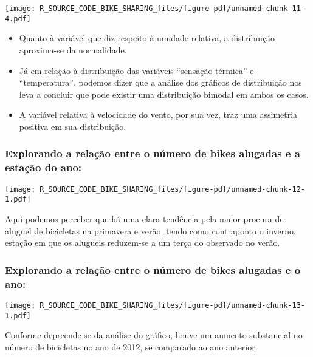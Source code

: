 \documentclass[
  letterpaper,
  DIV=11,
  numbers=noendperiod]{scrartcl}
\begin{document}
\begin{center}
\texttt{[image: R\_SOURCE\_CODE\_BIKE\_SHARING\_files/figure-pdf/unnamed-chunk-11-4.pdf]}
\end{center}

\begin{itemize}
\item
  Quanto à variável que diz respeito à umidade relativa, a distribuição
  aproxima-se da normalidade.
\item
  Já em relação à distribuição das variáveis ``sensação térmica'' e
  ``temperatura'', podemos dizer que a análise dos gráficos de
  distribuição nos leva a concluir que pode existir uma distribuição
  bimodal em ambos os casos.
\item
  A variável relativa à velocidade do vento, por sua vez, traz uma
  assimetria positiva em sua distribuição.
\end{itemize}

\subsubsection{Explorando a relação entre o número de bikes alugadas e a
estação do
ano:}\label{explorando-a-relauxe7uxe3o-entre-o-nuxfamero-de-bikes-alugadas-e-a-estauxe7uxe3o-do-ano}

\begin{center}
\texttt{[image: R\_SOURCE\_CODE\_BIKE\_SHARING\_files/figure-pdf/unnamed-chunk-12-1.pdf]}
\end{center}

Aqui podemos perceber que há uma clara tendência pela maior procura de
aluguel de bicicletas na primavera e verão, tendo como contraponto o
inverno, estação em que os alugueis reduzem-se a um terço do observado
no verão.

\subsubsection{Explorando a relação entre o número de bikes alugadas e o
ano:}\label{explorando-a-relauxe7uxe3o-entre-o-nuxfamero-de-bikes-alugadas-e-o-ano}

\begin{center}
\texttt{[image: R\_SOURCE\_CODE\_BIKE\_SHARING\_files/figure-pdf/unnamed-chunk-13-1.pdf]}
\end{center}

Conforme depreende-se da análise do gráfico, houve um aumento
substancial no número de bicicletas no ano de 2012, se comparado ao ano
anterior.
\end{document}
